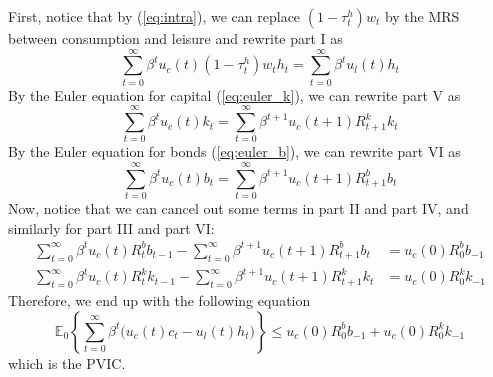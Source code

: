 \documentclass[12pt]{article}
\newcommand{\E}{\mathbb{E}}
\begin{document}
	First, notice that by (\ref{eq:intra}), we can replace $(1-\tau_t^h)w_t$ by the MRS between consumption and leisure and rewrite part I as 
	\begin{equation*}
		\sum_{t=0}^\infty \beta^t u_c(t)(1-\tau_t^h) w_t h_t = \sum_{t=0}^\infty \beta^t u_l(t) h_t
	\end{equation*}
		By the Euler equation for capital (\ref{eq:euler_k}), we can rewrite part V as
	\begin{equation*}
		\sum_{t=0}^\infty \beta^t u_c(t) k_t = \sum_{t=0}^\infty \beta^{t+1}u_c(t+1)R_{t+1}^k k_{t}
	\end{equation*}
		By the Euler equation for bonds (\ref{eq:euler_b}), we can rewrite part VI as
	\begin{equation*}
		\sum_{t=0}^\infty \beta^t u_c(t) b_t = \sum_{t=0}^\infty \beta^{t+1}u_c(t+1)R_{t+1}^b b_t
	\end{equation*}
	Now, notice that we can cancel out some terms in part II and part IV, and similarly for part III and part VI:
	\begin{align}
		\sum_{t=0}^\infty \beta^t u_c(t) R_t^b b_{t-1} - \sum_{t=0}^\infty \beta^{t+1}u_c(t+1)R_{t+1}^b b_t &= u_c(0)R_0^bb_{-1}\\
		\sum_{t=0}^\infty \beta^t u_c(t) R_t^k k_{t-1} - \sum_{t=0}^\infty \beta^{t+1}u_c(t+1)R_{t+1}^k k_t &= u_c(0)R_0^kk_{-1}
	\end{align}
Therefore, we end up with the following equation 
	\begin{equation*}
		\E_0 \left\{\sum_{t=0}^\infty \beta^t \big(u_c(t) c_t - u_l(t) h_t \big) \right\} \leq u_c(0)R_0^bb_{-1} + u_c(0)R_0^kk_{-1}
	\end{equation*}
which is the PVIC.
\end{document}
